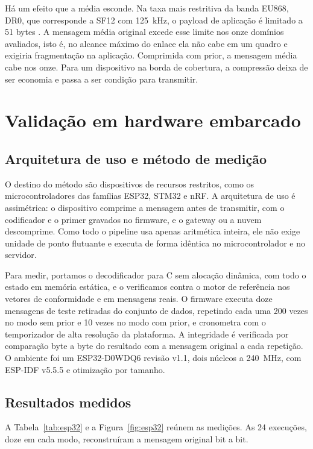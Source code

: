 \documentclass[12pt]{article}
\begin{document}
Há um efeito que a média esconde. Na taxa mais restritiva da banda EU868, DR0,
que corresponde a SF12 com 125~kHz, o payload de aplicação é limitado a 51 bytes
\cite{loraalliance:18b}. A mensagem média original excede esse limite nos onze
domínios avaliados, isto é, no alcance máximo do enlace ela não cabe em um
quadro e exigiria fragmentação na aplicação. Comprimida com prior, a mensagem
média cabe nos onze. Para um dispositivo na borda de cobertura, a compressão
deixa de ser economia e passa a ser condição para transmitir.

\section{Validação em hardware embarcado}
\label{sec:embarcado}

\subsection{Arquitetura de uso e método de medição}

O destino do método são dispositivos de recursos restritos, como os
microcontroladores das famílias ESP32, STM32 e nRF. A arquitetura de uso é
assimétrica: o dispositivo comprime a mensagem antes de transmitir, com o
codificador e o primer gravados no firmware, e o gateway ou a nuvem descomprime.
Como todo o pipeline usa apenas aritmética inteira, ele não exige unidade de
ponto flutuante e executa de forma idêntica no microcontrolador e no servidor.

Para medir, portamos o decodificador para C sem alocação dinâmica, com todo o
estado em memória estática, e o verificamos contra o motor de referência nos
vetores de conformidade e em mensagens reais. O firmware executa doze mensagens
de teste retiradas do conjunto de dados, repetindo cada uma 200 vezes no modo
sem prior e 10 vezes no modo com prior, e cronometra com o temporizador de alta
resolução da plataforma. A integridade é verificada por comparação byte a byte
do resultado com a mensagem original a cada repetição. O ambiente foi um
ESP32-D0WDQ6 revisão v1.1, dois núcleos a 240~MHz, com ESP-IDF v5.5.5 e
otimização por tamanho.

\subsection{Resultados medidos}

A Tabela~\ref{tab:esp32} e a Figura~\ref{fig:esp32} reúnem as medições. As 24
execuções, doze em cada modo, reconstruíram a mensagem original bit a bit.
\end{document}
